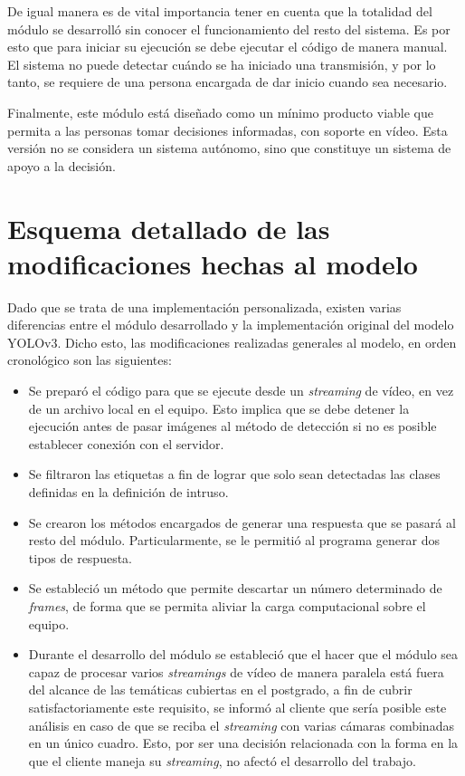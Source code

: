 De igual manera es de vital importancia tener en cuenta que la totalidad del módulo se desarrolló sin conocer el funcionamiento del resto del sistema. Es por esto que para iniciar su ejecución se debe ejecutar el código de manera manual. El sistema no puede detectar cuándo se ha iniciado una transmisión, y por lo tanto, se requiere de una persona encargada de dar inicio cuando sea necesario. 

Finalmente, este módulo está diseñado como un mínimo producto viable que permita a las personas tomar decisiones informadas, con soporte en vídeo. Esta versión no se considera un sistema autónomo, sino que constituye un sistema de apoyo a la decisión. 


\section{Esquema detallado de las modificaciones hechas al modelo}

Dado que se trata de una implementación personalizada, existen varias diferencias entre el módulo desarrollado y la implementación original del modelo YOLOv3. Dicho esto, las modificaciones realizadas generales al modelo, en orden cronológico son las siguientes:

\begin{itemize}

	\item Se preparó el código para que se ejecute desde un \textit{streaming} de vídeo, en vez de un archivo local en el equipo. Esto implica que se debe detener la ejecución antes de pasar imágenes al método de detección si no es posible establecer conexión con el servidor.
	\item Se filtraron las etiquetas a fin de lograr que solo sean detectadas las clases definidas en la definición de intruso.
	\item Se crearon los métodos encargados de generar una respuesta que se pasará al resto del módulo. Particularmente, se le permitió al programa generar dos tipos de respuesta.
	\item Se estableció un método que permite descartar un número determinado de \textit{frames}, de forma que se permita aliviar la carga computacional sobre el equipo.
	\item Durante el desarrollo del módulo se estableció que el hacer que el módulo sea capaz de procesar varios \textit{streamings} de vídeo de manera paralela está fuera del alcance de las temáticas cubiertas en el postgrado, a fin de cubrir satisfactoriamente este requisito, se informó al cliente que sería posible este análisis en caso de que se reciba el \textit{streaming} con varias cámaras combinadas en un único cuadro. Esto, por ser una decisión relacionada con la forma en la que el cliente maneja su \textit{streaming}, no afectó el desarrollo del trabajo. 

\end{itemize}


